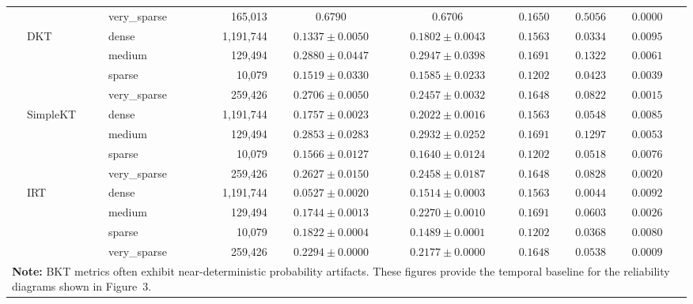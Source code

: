 \begin{table}[h]
\begin{tabular}{lllrcccccc}
 &  & very\_sparse & 165,013 & $0.6790$ & $0.6706$ & $0.1650$ & $0.5056$ & $0.0000$ \\
 & DKT & dense & 1,191,744 & $0.1337 \pm 0.0050$ & $0.1802 \pm 0.0043$ & $0.1563$ & $0.0334$ & $0.0095$ \\
 &  & medium & 129,494 & $0.2880 \pm 0.0447$ & $0.2947 \pm 0.0398$ & $0.1691$ & $0.1322$ & $0.0061$ \\
 &  & sparse & 10,079 & $0.1519 \pm 0.0330$ & $0.1585 \pm 0.0233$ & $0.1202$ & $0.0423$ & $0.0039$ \\
 &  & very\_sparse & 259,426 & $0.2706 \pm 0.0050$ & $0.2457 \pm 0.0032$ & $0.1648$ & $0.0822$ & $0.0015$ \\
 & SimpleKT & dense & 1,191,744 & $0.1757 \pm 0.0023$ & $0.2022 \pm 0.0016$ & $0.1563$ & $0.0548$ & $0.0085$ \\
 &  & medium & 129,494 & $0.2853 \pm 0.0283$ & $0.2932 \pm 0.0252$ & $0.1691$ & $0.1297$ & $0.0053$ \\
 &  & sparse & 10,079 & $0.1566 \pm 0.0127$ & $0.1640 \pm 0.0124$ & $0.1202$ & $0.0518$ & $0.0076$ \\
 &  & very\_sparse & 259,426 & $0.2627 \pm 0.0150$ & $0.2458 \pm 0.0187$ & $0.1648$ & $0.0828$ & $0.0020$ \\
 & IRT & dense & 1,191,744 & $0.0527 \pm 0.0020$ & $0.1514 \pm 0.0003$ & $0.1563$ & $0.0044$ & $0.0092$ \\
 &  & medium & 129,494 & $0.1744 \pm 0.0013$ & $0.2270 \pm 0.0010$ & $0.1691$ & $0.0603$ & $0.0026$ \\
 &  & sparse & 10,079 & $0.1822 \pm 0.0004$ & $0.1489 \pm 0.0001$ & $0.1202$ & $0.0368$ & $0.0080$ \\
 &  & very\_sparse & 259,426 & $0.2294 \pm 0.0000$ & $0.2177 \pm 0.0000$ & $0.1648$ & $0.0538$ & $0.0009$ \\
\midrule
\multicolumn{9}{p{17.5cm}}{\scriptsize \textbf{Note:} BKT metrics often exhibit near-deterministic probability artifacts. These figures provide the temporal baseline for the reliability diagrams shown in Figure~3.} \\
\bottomrule
\end{tabular}
\end{table}
